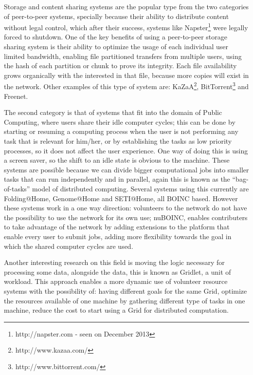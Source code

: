 Storage and content sharing systems are the popular type from the two categories of peer-to-peer systems, specially because their ability to distribute content without legal control, which after their success, systems like Napster\footnote{http://napster.com - seen on December 2013} were legally forced to shutdown. One of the key benefits of using a peer-to-peer storage sharing system is their ability to optimize the usage of each individual user limited bandwidth, enabling file partitioned transfers from multiple users, using the hash of each partition or chunk to prove its integrity. Each file availability grows organically with the interested in that file, because more copies will exist in the network. Other examples of this type of system are: KaZaA\footnote{http://www.kazaa.com/}, BitTorrent\footnote{http://www.bittorrent.com/} and Freenet\cite{Clarke2001}.

The second category is that of systems that fit into the domain of Public Computing, where users share their idle computer cycles; this can be done by starting or resuming a computing process when the user is not performing any task that is relevant for him/her, or by establishing the tasks as low priority processes, so it does not affect the user experience. One way of doing this is using a screen saver, so the shift to an idle state is obvious to the machine. These systems are possible because we can divide bigger computational jobs into smaller tasks that can run independently and in parallel, again this is known as the ``bag-of-tasks'' model of distributed computing. Several systems using this currently are Folding@Home, Genome@Home\cite{Larson2002} and SETI@Home\cite{Anderson2002}\cite{Korpela2001}, all BOINC\cite{Anderson2015} based. However these systems work in a one way direction: volunteers to the network do not have the possibility to use the network for its own use; nuBOINC\cite{Silva2008}, enables contributers to take advantage of the network by adding extensions to the platform that enable every user to submit jobs, adding more flexibility towards the goal in which the shared computer cycles are used. 

Another interesting research on this field is moving the logic necessary for processing some data, alongside the data, this is known as Gridlet\cite{Costa2012}\cite{Rodrigues}, a unit of workload. This approach enables a more dynamic use of volunteer resource systems with the possibility of: having different goals for the same Grid, optimize the resources available of one machine by gathering different type of tasks in one machine, reduce the cost to start using a Grid for distributed computation.

